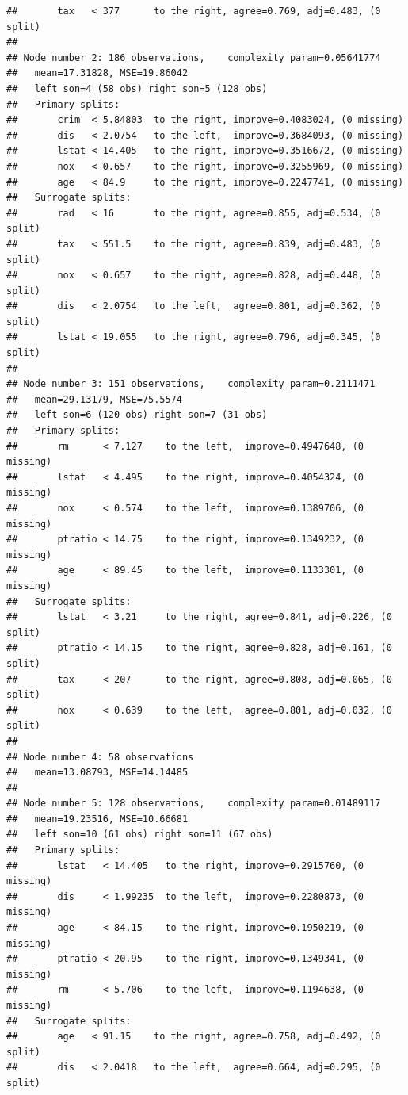 \documentclass[]{book}
\theoremstyle{plain}
\theoremstyle{definition}
\begin{document}
\begin{verbatim}
##       tax   < 377      to the right, agree=0.769, adj=0.483, (0 split)
## 
## Node number 2: 186 observations,    complexity param=0.05641774
##   mean=17.31828, MSE=19.86042 
##   left son=4 (58 obs) right son=5 (128 obs)
##   Primary splits:
##       crim  < 5.84803  to the right, improve=0.4083024, (0 missing)
##       dis   < 2.0754   to the left,  improve=0.3684093, (0 missing)
##       lstat < 14.405   to the right, improve=0.3516672, (0 missing)
##       nox   < 0.657    to the right, improve=0.3255969, (0 missing)
##       age   < 84.9     to the right, improve=0.2247741, (0 missing)
##   Surrogate splits:
##       rad   < 16       to the right, agree=0.855, adj=0.534, (0 split)
##       tax   < 551.5    to the right, agree=0.839, adj=0.483, (0 split)
##       nox   < 0.657    to the right, agree=0.828, adj=0.448, (0 split)
##       dis   < 2.0754   to the left,  agree=0.801, adj=0.362, (0 split)
##       lstat < 19.055   to the right, agree=0.796, adj=0.345, (0 split)
## 
## Node number 3: 151 observations,    complexity param=0.2111471
##   mean=29.13179, MSE=75.5574 
##   left son=6 (120 obs) right son=7 (31 obs)
##   Primary splits:
##       rm      < 7.127    to the left,  improve=0.4947648, (0 missing)
##       lstat   < 4.495    to the right, improve=0.4054324, (0 missing)
##       nox     < 0.574    to the left,  improve=0.1389706, (0 missing)
##       ptratio < 14.75    to the right, improve=0.1349232, (0 missing)
##       age     < 89.45    to the left,  improve=0.1133301, (0 missing)
##   Surrogate splits:
##       lstat   < 3.21     to the right, agree=0.841, adj=0.226, (0 split)
##       ptratio < 14.15    to the right, agree=0.828, adj=0.161, (0 split)
##       tax     < 207      to the right, agree=0.808, adj=0.065, (0 split)
##       nox     < 0.639    to the left,  agree=0.801, adj=0.032, (0 split)
## 
## Node number 4: 58 observations
##   mean=13.08793, MSE=14.14485 
## 
## Node number 5: 128 observations,    complexity param=0.01489117
##   mean=19.23516, MSE=10.66681 
##   left son=10 (61 obs) right son=11 (67 obs)
##   Primary splits:
##       lstat   < 14.405   to the right, improve=0.2915760, (0 missing)
##       dis     < 1.99235  to the left,  improve=0.2280873, (0 missing)
##       age     < 84.15    to the right, improve=0.1950219, (0 missing)
##       ptratio < 20.95    to the right, improve=0.1349341, (0 missing)
##       rm      < 5.706    to the left,  improve=0.1194638, (0 missing)
##   Surrogate splits:
##       age   < 91.15    to the right, agree=0.758, adj=0.492, (0 split)
##       dis   < 2.0418   to the left,  agree=0.664, adj=0.295, (0 split)

\end{verbatim}
\end{document}
